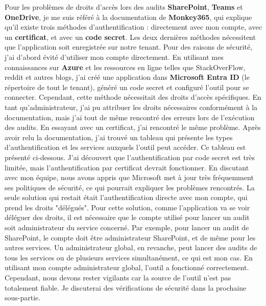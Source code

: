 Pour les problèmes de droits d'accès lors des audits \textbf{SharePoint}, \textbf{Teams} et \textbf{OneDrive}, je me suis référé à la documentation de \textbf{Monkey365}, qui explique qu'il existe trois méthodes d'authentification : directement avec mon compte, avec un \textbf{certificat}, et avec un \textbf{code secret}. Les deux dernières méthodes nécessitent que l'application soit enregistrée sur notre tenant. Pour des raisons de sécurité, j'ai d'abord évité d'utiliser mon compte directement. En utilisant mes connaissances sur \textbf{Azure} et les ressources en ligne telles que StackOverFlow, reddit et autres blogs, j'ai créé une application dans \textbf{Microsoft Entra ID} (le répertoire de tout le tenant), généré un code secret et configuré l'outil pour se connecter. Cependant, cette méthode nécessitait des droits d'accès spécifiques. En tant qu'administrateur, j'ai pu attribuer les droits nécessaires conformément à la documentation, mais j'ai tout de même rencontré des erreurs lors de l'exécution des audits. En essayant avec un certificat, j'ai rencontré le même problème. Après avoir relu la documentation, j'ai trouvé un tableau qui présente les types d'authentification et les services auxquels l'outil peut accéder. Ce tableau est présenté ci-dessous. J'ai découvert que l'authentification par code secret est très limitée, mais l'authentification par certificat devrait fonctionner. En discutant avec mon équipe, nous avons appris que Microsoft met à jour très fréquemment ses politiques de sécurité, ce qui pourrait expliquer les problèmes rencontrés. La seule solution qui restait était l'authentification directe avec mon compte, qui prend les droits "délégués". Pour cette solution, comme l'application va se voir déléguer des droits, il est nécessaire que le compte utilisé pour lancer un audit soit administrateur du service concerné. Par exemple, pour lancer un audit de SharePoint, le compte doit être administrateur SharePoint, et de même pour les autres services. Un administrateur global, en revanche, peut lancer des audits de tous les services ou de plusieurs services simultanément, ce qui est mon cas. En utilisant mon compte administrateur global, l'outil a fonctionné correctement. Cependant, nous devons rester vigilants car la source de l'outil n'est pas totalement fiable. Je discuterai des vérifications de sécurité dans la prochaine sous-partie.

